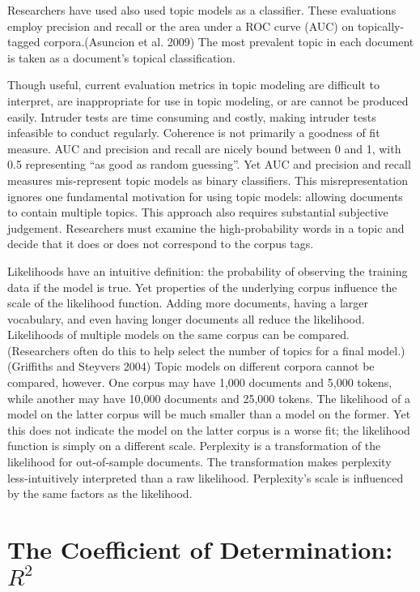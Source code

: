 \documentclass[conference,final,]{IEEEtran}
\begin{document}
Researchers have used also used topic models as a classifier. These
evaluations employ precision and recall or the area under a ROC curve
(AUC) on topically-tagged corpora.(Asuncion et al. 2009) The most
prevalent topic in each document is taken as a document's topical
classification.

Though useful, current evaluation metrics in topic modeling are
difficult to interpret, are inappropriate for use in topic modeling, or
are cannot be produced easily. Intruder tests are time consuming and
costly, making intruder tests infeasible to conduct regularly. Coherence
is not primarily a goodness of fit measure. AUC and precision and recall
are nicely bound between 0 and 1, with 0.5 representing ``as good as
random guessing''. Yet AUC and precision and recall measures
mis-represent topic models as binary classifiers. This misrepresentation
ignores one fundamental motivation for using topic models: allowing
documents to contain multiple topics. This approach also requires
substantial subjective judgement. Researchers must examine the
high-probability words in a topic and decide that it does or does not
correspond to the corpus tags.

Likelihoods have an intuitive definition: the probability of observing
the training data if the model is true. Yet properties of the underlying
corpus influence the scale of the likelihood function. Adding more
documents, having a larger vocabulary, and even having longer documents
all reduce the likelihood. Likelihoods of multiple models on the same
corpus can be compared. (Researchers often do this to help select the
number of topics for a final model.)(Griffiths and Steyvers 2004) Topic
models on different corpora cannot be compared, however. One corpus may
have 1,000 documents and 5,000 tokens, while another may have 10,000
documents and 25,000 tokens. The likelihood of a model on the latter
corpus will be much smaller than a model on the former. Yet this does
not indicate the model on the latter corpus is a worse fit; the
likelihood function is simply on a different scale. Perplexity is a
transformation of the likelihood for out-of-sample documents. The
transformation makes perplexity less-intuitively interpreted than a raw
likelihood. Perplexity's scale is influenced by the same factors as the
likelihood.

\hypertarget{the-coefficient-of-determination-r2}{%
\section{\texorpdfstring{The Coefficient of Determination:
\(R^2\)}{The Coefficient of Determination: R\^{}2}}\label{the-coefficient-of-determination-r2}}
\end{document}
